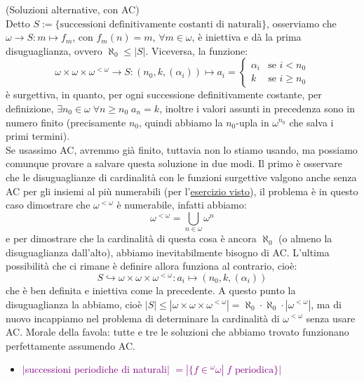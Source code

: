 \begin{soln}
	(Soluzioni alternative, con AC)\\
	Detto $S := \{\text{successioni definitivamente costanti di naturali}\}$, osserviamo che $\omega \to S : m \mapsto f_m$, con $f_m(n) = m$, $\forall m \in \omega$, è iniettiva e dà la prima disuguaglianza, ovvero $\aleph_0 \leq |S|$.
	Viceversa, la funzione:
	\[ \omega \times \omega \times \omega^{<\omega} \to S : (n_0,k,(\alpha_i)) \mapsto a_i = \begin{cases}
		\alpha_i &\text{se $i < n_0$} \\
		k &\text{se $i \geq n_0$}
	\end{cases}
		\]
	è surgettiva, in quanto, per ogni successione definitivamente costante, per definizione, $\exists n_0 \in \omega \; \forall n \geq n_0 \; a_n = k$, inoltre i valori assunti in precedenza sono in numero finito (precisamente $n_0$, quindi abbiamo la $n_0$-upla in $\omega^{n_0}$ che salva i primi termini).\\
	Se usassimo AC, avremmo già finito, tuttavia non lo stiamo usando, ma possiamo comunque provare a salvare questa soluzione in due modi.
	Il primo è osservare che le disuguaglianze di cardinalità con le funzioni surgettive valgono anche senza AC per gli insiemi al più numerabili (per l'\hyperref[disuguaglianze_senza_AC2]{esercizio visto}), il problema è in questo caso dimostrare che $\omega^{<\omega}$ è numerabile, infatti abbiamo:
	\[ \omega^{<\omega} = \bigcup_{n \in \omega} \omega^n
		\]
	e per dimostrare che la cardinalità di questa cosa è ancora $\aleph_0$ (o almeno la disuguaglianza dall'alto), abbiamo inevitabilmente bisogno di AC. L'ultima possibilità che ci rimane è definire allora funziona al contrario, cioè:
	\[ S \hookrightarrow \omega \times \omega \times \omega^{<\omega} : a_i \mapsto (n_0,k,(\alpha_i))
		\]
	che è ben definita e iniettiva come la precedente. A questo punto la disuguaglianza la abbiamo, cioè $|S| \leq |\omega \times \omega \times \omega^{<\omega}| = \aleph_0 \cdot \aleph_0 \cdot |\omega^{<\omega}|$, ma di nuovo incappiamo nel problema di determinare la cardinalità di $\omega^{<\omega}$ senza usare AC. Morale della favola:
	tutte e tre le soluzioni che abbiamo trovato funzionano perfettamente assumendo AC.
\end{soln}

\begin{itemize}
	\item \textcolor{purple}{$|$successioni periodiche di naturali$|$ $= |\{f \in {}^\omega \omega | \;\text{$f$ periodica}\}|$}
\end{itemize}

